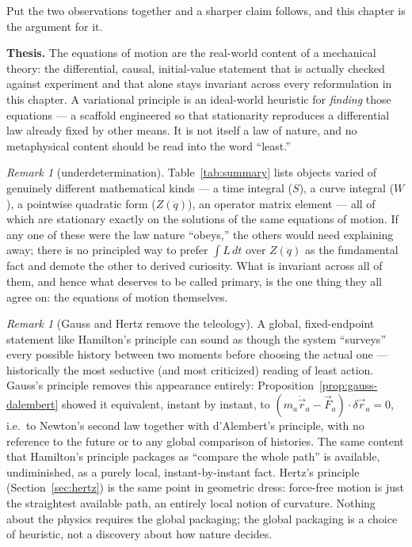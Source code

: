 \documentclass[11pt]{book}
\theoremstyle{definition}
\theoremstyle{plain}
\theoremstyle{remark}
\newtheorem{remark}[definition]{Remark}
\begin{document}
Put the two observations together and a sharper claim follows, and this chapter is the argument for it.

\begin{motto}
\textbf{Thesis.} The equations of motion are the real-world content of a mechanical theory: the differential, causal, initial-value statement that is actually checked against experiment and that alone stays invariant across every reformulation in this chapter. A variational principle is an ideal-world heuristic for \emph{finding} those equations --- a scaffold engineered so that stationarity reproduces a differential law already fixed by other means. It is not itself a law of nature, and no metaphysical content should be read into the word ``least.''
\end{motto}

\begin{remark}[underdetermination]
Table~\ref{tab:summary} lists objects varied of genuinely different mathematical kinds --- a time integral ($S$), a curve integral ($W$), a pointwise quadratic form ($Z(\ddot q)$), an operator matrix element --- all of which are stationary exactly on the solutions of the same equations of motion. If any one of these were the law nature ``obeys,'' the others would need explaining away; there is no principled way to prefer $\int L\,dt$ over $Z(\ddot q)$ as the fundamental fact and demote the other to derived curiosity. What is invariant across all of them, and hence what deserves to be called primary, is the one thing they all agree on: the equations of motion themselves.
\end{remark}

\begin{remark}[Gauss and Hertz remove the teleology]
A global, fixed-endpoint statement like Hamilton's principle can sound as though the system ``surveys'' every possible history between two moments before choosing the actual one --- historically the most seductive (and most criticized) reading of least action. Gauss's principle removes this appearance entirely: Proposition~\ref{prop:gauss-dalembert} showed it equivalent, instant by instant, to $(m_a\ddot{\vec r}_a-\vec F_a)\cdot\delta\vec r_a=0$, i.e.\ to Newton's second law together with d'Alembert's principle, with no reference to the future or to any global comparison of histories. The same content that Hamilton's principle packages as ``compare the whole path'' is available, undiminished, as a purely local, instant-by-instant fact. Hertz's principle (Section~\ref{sec:hertz}) is the same point in geometric dress: force-free motion is just the straightest available path, an entirely local notion of curvature. Nothing about the physics requires the global packaging; the global packaging is a choice of heuristic, not a discovery about how nature decides.
\end{remark}
\end{document}
